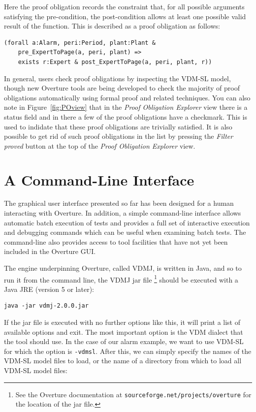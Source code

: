 {Here the proof obligation records the constraint that, for all
possible arguments satisfying the pre-condition, the post-condition
allows at least one possible valid result of the function. This is
described as a proof obligation as follows:

\begin{lstlisting}
(forall a:Alarm, peri:Period, plant:Plant &
    pre_ExpertToPage(a, peri, plant) => 
    exists r:Expert & post_ExpertToPage(a, peri, plant, r))
\end{lstlisting}

In general, users check proof obligations by inspecting the VDM-SL model,
though new Overture tools are being developed to check the majority of
proof obligations automatically using formal proof and related
techniques. You can also note in Figure~\ref{fig:POview} that in the
\emph{Proof Obligation Explorer} view there is a status field and in there
a few of the proof obligations have a checkmark. This is used to
indidate that these proof obligations are trivially satisfied. It is
also possible to get rid of such proof obligations in the list by
pressing the \emph{Filter proved} button at the top of the \emph{Proof
  Obligation Explorer} view.

\section{A Command-Line Interface}\label{sec:cmdline}

The graphical user interface presented so far has been designed for a
human interacting with Overture. In addition, a simple command-line
interface allows automatic batch execution of tests and provides a
full set of interactive execution and debugging commands which can be
useful when examining batch tests. The command-line also provides
access to tool facilities that have not yet been included in the
Overture GUI.

The engine underpinning Overture, called VDMJ, is written in Java, and
so to run it from the command line, the VDMJ jar file \footnote{See
  the Overture documentation at
  \texttt{sourceforge.net/projects/overture} for the location of the
  jar file.}  should be executed with a Java JRE (version 5 or later):

\lstset{style=tool,language=}
\begin{lstlisting}
java -jar vdmj-2.0.0.jar
\end{lstlisting}

\noindent If the jar file is executed with no further options like
this, it will print a list of available options and exit. The most
important option is the VDM dialect that the tool should use. In the
case of our alarm example, we want to use VDM-SL for which the option
is \verb|-vdmsl|. After this, we can simply specify the names of the
VDM-SL model files to load, or the name of a directory from which to
load all VDM-SL model files:

}
